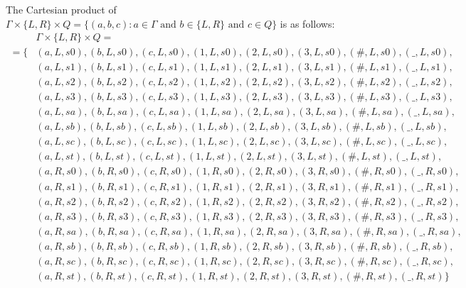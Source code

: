 \documentclass[12pt, a4paper, bibliography=totocnumbered]{report}
\begin{document}
{	The Cartesian product of $ \Gamma \times \{L,R\} \times Q = \{(a,b,c) : a \in \Gamma \text{~and~} b \in \{L,R\} \text{~and~} c \in Q \}$ is as follows:
		\begin{equation}\label{eq:Q_times_Gamma_times_LR}
		\begin{aligned}
		& \Gamma \times \{L,R\} \times Q = \\
		= \{    & (a, L, s0),(b, L, s0),(c, L, s0),(1, L, s0),(2, L, s0),(3, L, s0),(\#, L, s0),(\_, L, s0), \\
		& (a, L, s1),(b, L, s1),(c, L, s1),(1, L, s1),(2, L, s1),(3, L, s1),(\#, L, s1),(\_, L, s1), \\
		& (a, L, s2),(b, L, s2),(c, L, s2),(1, L, s2),(2, L, s2),(3, L, s2),(\#, L, s2),(\_, L, s2), \\
		& (a, L, s3),(b, L, s3),(c, L, s3),(1, L, s3),(2, L, s3),(3, L, s3),(\#, L, s3),(\_, L, s3), \\
		& (a, L, sa),(b, L, sa),(c, L, sa),(1, L, sa),(2, L, sa),(3, L, sa),(\#, L, sa),(\_, L, sa), \\
		& (a, L, sb),(b, L, sb),(c, L, sb),(1, L, sb),(2, L, sb),(3, L, sb),(\#, L, sb),(\_, L, sb), \\
		& (a, L, sc),(b, L, sc),(c, L, sc),(1, L, sc),(2, L, sc),(3, L, sc),(\#, L, sc),(\_, L, sc), \\
		& (a, L, st),(b, L, st),(c, L, st),(1, L, st),(2, L, st),(3, L, st),(\#, L, st),(\_, L, st), \\
		& (a, R, s0),(b, R, s0),(c, R, s0),(1, R, s0),(2, R, s0),(3, R, s0),(\#, R, s0),(\_, R, s0), \\
		& (a, R, s1),(b, R, s1),(c, R, s1),(1, R, s1),(2, R, s1),(3, R, s1),(\#, R, s1),(\_, R, s1), \\
		& (a, R, s2),(b, R, s2),(c, R, s2),(1, R, s2),(2, R, s2),(3, R, s2),(\#, R, s2),(\_, R, s2), \\
		& (a, R, s3),(b, R, s3),(c, R, s3),(1, R, s3),(2, R, s3),(3, R, s3),(\#, R, s3),(\_, R, s3), \\
		& (a, R, sa),(b, R, sa),(c, R, sa),(1, R, sa),(2, R, sa),(3, R, sa),(\#, R, sa),(\_, R, sa), \\
		& (a, R, sb),(b, R, sb),(c, R, sb),(1, R, sb),(2, R, sb),(3, R, sb),(\#, R, sb),(\_, R, sb), \\
		& (a, R, sc),(b, R, sc),(c, R, sc),(1, R, sc),(2, R, sc),(3, R, sc),(\#, R, sc),(\_, R, sc), \\
		& (a, R, st),(b, R, st),(c, R, st),(1, R, st),(2, R, st),(3, R, st),(\#, R, st),(\_, R, st) \}      \\
		\end{aligned}
		\end{equation}
		
}
\end{document}
